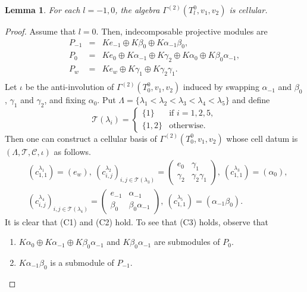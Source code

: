 \documentclass[12pt]{amsart}
\newtheorem{lem}[thm]{Lemma}
\numberwithin{equation}{thm}
\newcommand\cC{\mathcal{C}}
\newcommand\cT{\mathcal{T}}
\begin{document}
{\begin{lem}\label{D V-5} For each $l=-1,0$, the algebra $\Gamma^{(2)}(T_{l}^{0},v_1,v_2)$ is cellular.
\end{lem}
\begin{proof} Assume that $l=0$. Then, indecomposable projective modules are 
\[\begin{array}{lcl}
P_{-1} &=& Ke_{-1}\oplus K \beta_{0}\oplus K\alpha_{-1}\beta_{0}, \\
P_{0} &=& Ke_0\oplus K\alpha_{-1}\oplus K\gamma_{2} \oplus K\alpha_0\oplus K\beta_0\alpha_{-1}, \\
P_{w} &=& Ke_{w} \oplus K\gamma_{1}\oplus K\gamma_2\gamma_1. \\
\end{array} \]
Let $\iota$ be the anti-involution of $\Gamma^{(2)}(T_{0}^{0},v_1,v_2)$ induced by 
swapping $\alpha_{-1}$ and $\beta_0$, $\gamma_1$ and $\gamma_2$, and fixing $\alpha_0$. 
Put $\Lambda=\{ \lambda_1<\lambda_2<\lambda_3<\lambda_4<\lambda_5\}$ and define
\[
\cT(\lambda_i)=\left\{\begin{array}{ll}
\{1\} & \text{if $i=1,2,5$}, \\
\{1,2\} & \text{otherwise.}\end{array}\right. 
\]
Then one can construct a cellular basis of $\Gamma^{(2)}(T_{0}^{0},v_1,v_2)$ 
whose cell datum is $(\Lambda, \cT, \cC, \iota)$ as follows.
\begin{align*}
& (c_{1,1}^{\lambda_1})=(e_w),\ 
(c_{i,j}^{\lambda_2})_{i,j\in\cT(\lambda_{3})}=
\begin{pmatrix}
e_0 &  \gamma_1 \\
\gamma_2 & \gamma_2\gamma_1 \end{pmatrix},\ 
(c_{1,1}^{\lambda_3})=(\alpha_0), \\[7pt]
& (c_{i,j}^{\lambda_4})_{i,j\in\cT(\lambda_{4})}=
\begin{pmatrix}
e_{-1} &  \alpha_{-1} \\
\beta_0 & \beta_{0}\alpha_{-1} \end{pmatrix},\ (c_{1,1}^{\lambda_5})=(\alpha_{-1}\beta_0).
\end{align*}
It is clear that (C1) and (C2) hold. To see that (C3) holds, observe that 
\begin{enumerate}
\item $K\alpha_0\oplus K\alpha_{-1}\oplus K\beta_0\alpha_{-1}$ and $K\beta_0\alpha_{-1}$ are submodules of $P_0$.
\item $K\alpha_{-1}\beta_0$ is a submodule of $P_{-1}$.
\end{enumerate}


\end{proof}}
\end{document}
